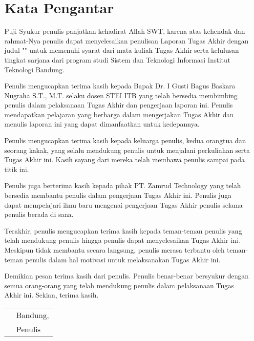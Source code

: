 \chapter*{Kata Pengantar}

Puji Syukur penulis panjatkan kehadirat Allah SWT, karena atas kehendak dan rahmat-Nya penulis dapat menyelesaikan penulisan Laporan Tugas Akhir dengan judul "\thetitle " untuk memenuhi syarat dari mata kuliah Tugas Akhir serta kelulusan tingkat sarjana dari program studi Sistem dan Teknologi Informasi Institut Teknologi Bandung.

Penulis mengucapkan terima kasih kepada Bapak Dr. I Gusti Bagus Baskara Nugraha S.T., M.T. selaku dosen STEI ITB yang telah bersedia membimbing penulis dalam pelaksanaan Tugas Akhir dan pengerjaan laporan ini. Penulis mendapatkan pelajaran yang berharga dalam mengerjakan Tugas Akhir dan menulis laporan ini yang dapat dimanfaatkan untuk kedepannya.

Penulis mengucapkan terima kasih kepada keluarga penulis, kedua orangtua dan seorang kakak, yang selalu mendukung penulis untuk menjalani perkuliahan serta Tugas Akhir ini. Kasih sayang dari mereka telah membawa penulis sampai pada titik ini.

Penulis juga berterima kasih kepada pihak PT. Zamrud Technology yang telah bersedia membantu penulis dalam pengerjaan Tugas Akhir ini. Penulis juga dapat mempelajari ilmu baru mengenai pengerjaan Tugas Akhir penulis selama penulis berada di sana.

Terakhir, penulis mengucapkan terima kasih kepada teman-teman penulis yang telah mendukung penulis hingga penulis dapat menyelesaikan Tugas Akhir ini. Meskipun tidak membantu secara langsung, penulis merasa terbantu oleh teman-teman penulis dalam hal motivasi untuk melaksanakan Tugas Akhir ini.

Demikian pesan terima kasih dari penulis. Penulis benar-benar bersyukur dengan semua orang-orang yang telah mendukung penulis dalam pelaksanaan Tugas Akhir ini. Sekian, terima kasih.

\vspace{15mm}
\begin{tabularx}{\textwidth}{l@{\hskip 0.5\textwidth}l}
    & Bandung, \thedate{} \yearsidang{}\\
    & Penulis
\end{tabularx}